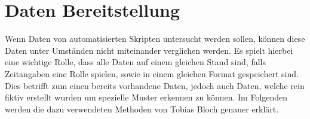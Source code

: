 \chapter{Daten Bereitstellung}

Wenn Daten von automatisierten Skripten untersucht werden sollen, können diese Daten unter Umständen nicht miteinander verglichen werden. Es spielt hierbei eine wichtige Rolle, dass alle Daten auf einem gleichen Stand sind, falls Zeitangaben eine Rolle spielen, sowie in einem gleichen Format gespeichert sind. Dies betrifft zum einen bereits vorhandene Daten, jedoch auch Daten, welche rein fiktiv erstellt wurden um spezielle Muster erkennen zu können. Im Folgenden werden die dazu verwendeten Methoden von Tobias Bloch genauer erklärt.




